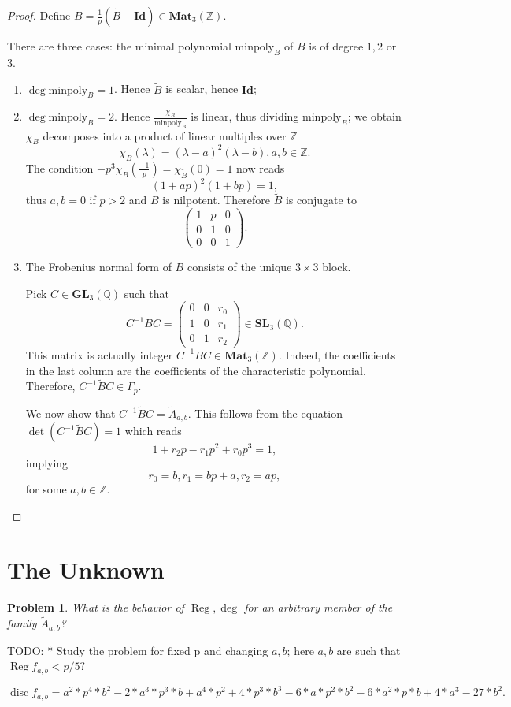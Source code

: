 \documentclass[a4paper]{article}
\newtheorem{Prob}[Thm]{Problem}
\newcommand{\Id}{\mathbf{Id}}        %
\newcommand{\GL}{\mathbf{GL}_3} %
\newcommand{\MatZ}{\mathbf{Mat}_3(\mathbb{Z})}        %
\newcommand{\SLp}{\Gamma_p}        %
\newcommand{\minpoly}{\mathrm{minpoly}}        %
\DeclareMathOperator{\Reg}{Reg}        %
\DeclareMathOperator{\disc}{disc}        %
\begin{document}
\begin{proof}
Define $B = \frac{1}{p}(\tilde B - \Id) \in \MatZ$.

There are three cases:
the minimal polynomial $\minpoly_B$ of $B$ is of degree $1, 2$ or $3$.
\begin{enumerate}
	\item $\deg \minpoly_B = 1$.  Hence $\tilde B$ is scalar, hence $\Id$;
	\item $\deg \minpoly_B = 2$.  Hence $ \frac{\chi_B}{\minpoly_B}$ is linear, thus dividing $\minpoly_B$; we obtain $\chi_B$ decomposes into a product of linear multiples over $ \mathbb{Z}$
	$$
	\chi_{B} (\lambda) = (\lambda - a)^2 (\lambda - b), a, b \in \mathbb{Z}.
	$$
	The condition $ - p^3 \chi_{B}( \frac{-1}{p}) = \chi_{\tilde B}(0) = 1$ now reads
	\[
	(1 + a p)^2 (1 + b p ) = 1
	,\] 
	thus $a, b = 0$ if $p > 2$ and $B$ is nilpotent.
	Therefore $\tilde B$ is conjugate to 
	\[
	\begin{pmatrix}
	1 & p & 0 \\
	0 & 1 & 0 \\
	0 & 0 & 1
	\end{pmatrix}
	.\] 
	\item
	The Frobenius normal form of 
	$B$ 
	consists of the unique $3 \times 3$ block.  

	Pick $C \in \GL( \mathbb{Q} ) $ such that 
	$$
	C^{-1} B C =
	\begin{pmatrix}
	0 & 0 & r_0 \\
	1 & 0 & r_1 \\
	0 & 1 & r_2
	\end{pmatrix} \in 
	\mathbf{SL}_3(\mathbb{Q})
	.$$ 
	This matrix is actually integer $ C^{-1} B C \in \MatZ$.
	Indeed, the coefficients in the last column are the coefficients of the characteristic polynomial. 
	Therefore, $ C^{-1} \tilde B C \in \SLp $.

	We now show that 
	$ C^{-1} \tilde B C = \tilde A_{a, b}$.
	This follows from the equation $\det (C^{-1} \tilde B C) = 1$ which reads
	\[
	1 + r_2 p - r_1 p^2 + r_0 p^3 = 1
	,\] 
	implying
	 \[
	r_0 = b, r_1 = bp + a, r_2 = ap,
	\] 
	for some $a, b \in \mathbb{Z}$.
\end{enumerate}


\end{proof}

\section{The Unknown}
\begin{Prob}
What is the behavior of $\Reg, \deg $ for an arbitrary member of the family $\tilde A_{a, b}$?
\end{Prob}

TODO:
* Study the problem for fixed p and changing $a, b$;
here $a, b$ are such that $\Reg f_{a,b} < p/5$?

\[
\disc f_{a,b} 
= a^2*p^4*b^2 - 2*a^3*p^3*b + a^4*p^2 + 4*p^3*b^3 - 6*a*p^2*b^2 - 6*a^2*p*b + 4*a^3 - 27*b^2
.\] 



















\end{document}
